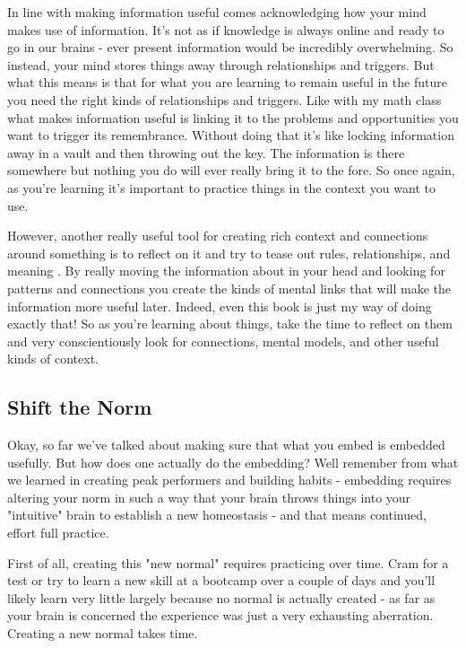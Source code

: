 \documentclass[11pt,a5paper]{book}
\begin{document}
In line with making information useful comes acknowledging how your mind makes use of information. It's not as if knowledge is always online and ready to go in our brains - ever present information would be incredibly overwhelming. So instead, your mind stores things away through relationships and triggers. But what this means is that for what you are learning to remain useful in the future you need the right kinds of relationships and triggers. Like with my math class what makes information useful is linking it to the problems and opportunities you want to trigger its remembrance. Without doing that it's like locking information away in a vault and then throwing out the key. The information is there somewhere but nothing you do will ever really bring it to the fore. So once again, as you're learning it's important to practice things in the context you want to use. 
\newline

However, another really useful tool for creating rich context and connections around something is to reflect on it and try to tease out rules, relationships, and meaning \cite{stick}. By really moving the information about in your head and looking for patterns and connections you create the kinds of mental links that will make the information more useful later. Indeed, even this book is just my way of doing exactly that! So as you're learning about things, take the time to reflect on them and very conscientiously look for connections, mental models, and other useful kinds of context. 
\newline

\subsection{Shift the Norm}
Okay, so far we've talked about making sure that what you embed is embedded usefully. But how does one actually do the embedding? Well remember from what we learned in creating peak performers and building habits - embedding requires altering your norm in such a way that your brain throws things into your "intuitive" brain to establish a new homeostasis \cite{duhigg} \cite{ericsson} - and that means continued, effort full practice. 
\newline

First of all, creating this "new normal" requires practicing over time. Cram for a test or try to learn a new skill at a bootcamp over a couple of days and you'll likely learn very little \cite{stick} largely because no normal is actually created - as far as your brain is concerned the experience was just a very exhausting aberration. Creating a new normal takes time.
\newline
\end{document}
